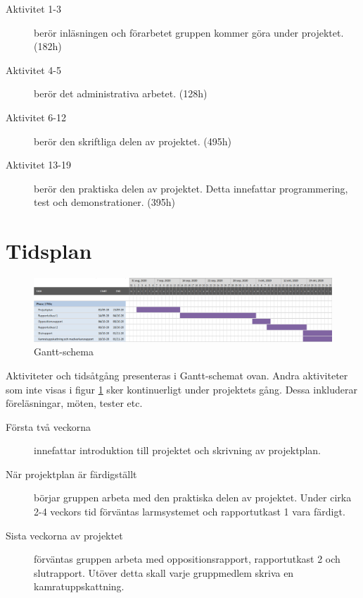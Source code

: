 \documentclass[a4paper]{article}
\begin{document}
\begin{description}
    \item[Aktivitet 1-3] berör inläsningen och förarbetet gruppen kommer göra under projektet. (182h)

    \item[Aktivitet 4-5] berör det administrativa arbetet. (128h)

    \item[Aktivitet 6-12] berör den skriftliga delen av projektet. (495h)

    \item[Aktivitet 13-19] berör den praktiska delen av projektet. Detta innefattar programmering, test och demonstrationer. (395h)

\end{description}


\section{Tidsplan}
\begin{figure}[H]
    \includegraphics[width=\textwidth]{Gantt-Schema1.png}
    \caption{Gantt-schema}
    \label{figure:gantt}
\end{figure}

Aktiviteter och tidsåtgång presenteras i Gantt-schemat ovan. Andra aktiviteter som inte visas i figur \ref{figure:gantt} sker kontinuerligt under projektets gång. Dessa inkluderar föreläsningar, möten, tester etc.
\begin{description}
\item [Första två veckorna] innefattar introduktion till projektet och skrivning av projektplan.

\item [När projektplan är färdigställt] börjar gruppen arbeta med den praktiska delen av projektet. Under cirka 2-4 veckors tid förväntas larmsystemet och rapportutkast 1 vara färdigt.

\item [Sista veckorna av projektet] förväntas gruppen arbeta med oppositionsrapport, rapportutkast 2 och slutrapport. Utöver detta skall varje gruppmedlem skriva en kamratuppskattning.
\end{description}
\end{document}
